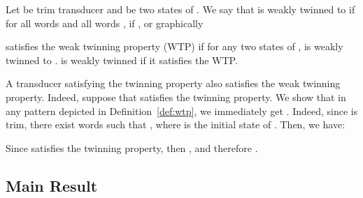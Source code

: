 \documentclass[envcountsame]{llncs}
\newcommand\trans[2]{\ensuremath{#1\mid #2}}
\begin{document}
\begin{definition}\label{def:wtp}
    Let  be trim transducer and  be two
    states of . We say that  is weakly twinned to
     if for all words
     and all words , if , or graphically
\begin{center}
\vspace{-1mm}
\end{center}
\vspace{-2mm}
\noindent  satisfies the weak twinning property (WTP) if for any
two states  of ,  is weakly twinned to
.  is weakly twinned if it satisfies the
WTP. 
\end{definition}


\begin{remark}\label{rm:TPvsWTP} 
A transducer satisfying the twinning property also satisfies the weak
twinning property. Indeed, suppose that  satisfies the twinning
property. We show that in any pattern depicted in
Definition~\ref{def:wtp}, we immediately get
. Indeed, since  is trim, 
there exist words  such
that , where  is the
initial state of . Then, we have:
\vspace{-2mm}

Since  satisfies the twinning property, then 
, and therefore
. 
\end{remark}



\vspace{-6mm} 
\subsection{Main Result}
\vspace{-2mm}
\end{document}
